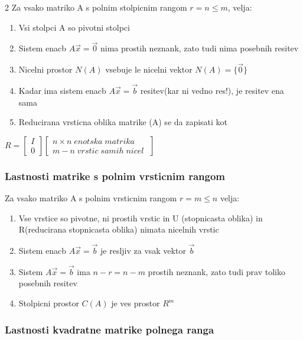 \documentclass{article}
\begin{document}
\begin{multicols}{2}
	Za vsako matriko A s polnim stolpicnim rangom $r = n \leq m$, velja:
	\begin{enumerate}
		\item Vsi stolpci A so pivotni stolpci
		\item Sistem enacb $A\vec{x} = \vec{0}$ nima prostih neznank, zato tudi nima posebnih resitev
		\item Nicelni prostor $N(A)$ vsebuje le nicelni vektor $N(A) = \{\vec{0}\}$
		\item Kadar ima sistem enacb $A\vec{x} = \vec{b}$ resitev(kar ni vedno res!), je resitev ena sama
		\item Reducirana vrsticna oblika matrike (A) se da zapisati kot
	\end{enumerate}
	\begin{center}
		$R =
			\begin{bmatrix}
				I \\
				0
			\end{bmatrix}
			\begin{bmatrix}
				n \times n\; enotska\; matrika \\
				m - n\; vrstic\; samih\; nicel\;
			\end{bmatrix}
		$
	\end{center}

	\subsubsection{Lastnosti matrike s polnim vrsticnim rangom}

	Za vsako matriko A s polnim vrsticnim rangom $r = m \leq n$ velja:
	\begin{enumerate}
		\item Vse vrstice so pivotne, ni prostih vrstic in U (stopnicasta oblika) in R(reducirana stopnicasta oblika) nimata nicelnih vrstic
		\item Sistem enacb $A\vec{x} = \vec{b}$ je resljiv za vsak vektor $\vec{b}$
		\item Sistem $A\vec{x} = \vec{b}$ ima $n-r = n-m$ prostih neznank, zato tudi prav toliko posebnih resitev
		\item Stolpicni prostor $C(A)$ je ves prostor $R^{m}$
	\end{enumerate}

	\subsubsection{Lastnosti kvadratne matrike polnega ranga}


\end{multicols}
\end{document}
